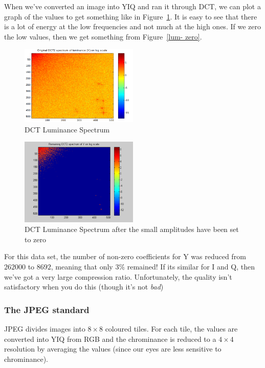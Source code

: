 When we've converted an image into YIQ and ran it through DCT, we can plot a
graph of the values to get something like in Figure~\ref{lum}. It is easy to see
that there is a lot of energy at the low frequencies and not much at the high
ones. If we zero the low values, then we get something from Figure~\ref{lum-
zero}.

\begin{figure}[ht]
  \centering
  \includegraphics[width=0.5\textwidth]{images/lum}
  \caption{DCT Luminance Spectrum}
  \label{lum}
\end{figure}

\begin{figure}[ht]
  \centering
  \includegraphics[width=0.5\textwidth]{images/lum-zero}
  \caption{DCT Luminance Spectrum after the small amplitudes have been set to
  zero}
  \label{lum-zero}
\end{figure}

For this data set, the number of non-zero coefficients for Y was reduced from
$262000$ to $8692$, meaning that only $3\%$ remained! If its similar for I and
Q, then we've got a very large compression ratio. Unfortunately, the quality
isn't satisfactory when you do this (though it's not \textit{bad})

\subsubsection{The JPEG standard}

JPEG divides images into $8 \times 8$ coloured tiles. For each tile, the values
are converted into YIQ from RGB and the chrominance is reduced to a $4 \times 4$
resolution by averaging the values (since our eyes are less sensitive to
chrominance).

